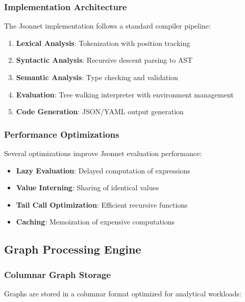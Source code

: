 \documentclass[11pt,a4paper]{article}
\begin{document}
\subsubsection{Implementation Architecture}
\label{subsubsec:jsonnet_architecture}

The Jsonnet implementation follows a standard compiler pipeline:

\begin{enumerate}
\item \textbf{Lexical Analysis}: Tokenization with position tracking
\item \textbf{Syntactic Analysis}: Recursive descent parsing to AST
\item \textbf{Semantic Analysis}: Type checking and validation
\item \textbf{Evaluation}: Tree walking interpreter with environment management
\item \textbf{Code Generation}: JSON/YAML output generation
\end{enumerate}

\subsubsection{Performance Optimizations}
\label{subsubsec:jsonnet_performance}

Several optimizations improve Jsonnet evaluation performance:

\begin{itemize}
\item \textbf{Lazy Evaluation}: Delayed computation of expressions
\item \textbf{Value Interning}: Sharing of identical values
\item \textbf{Tail Call Optimization}: Efficient recursive functions
\item \textbf{Caching}: Memoization of expensive computations
\end{itemize}

\subsection{Graph Processing Engine}
\label{subsec:graph_engine}

\subsubsection{Columnar Graph Storage}
\label{subsubsec:columnar_storage}

Graphs are stored in a columnar format optimized for analytical workloads:
\end{document}
